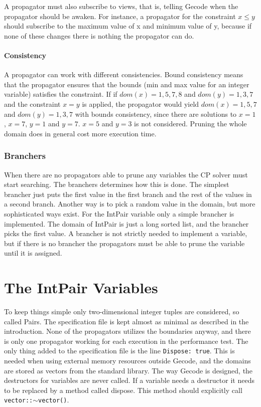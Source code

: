 \documentclass[a4paper,11pt]{article}
\begin{document}
A propagator must also subscribe to views, that is, telling Gecode when the propagator should be awaken. For instance, a propagator for the constraint $x\le y$ should subscribe to the maximum value of x and minimum value of y, because if none of these changes there is nothing the propagator can do.

\paragraph{Consistency}
A propagator can work with different consistencies. Bound consistency means that the propagator ensures that the bounds (min and max value for an integer variable) satisfies the constraint. If if $dom(x)={1,5,7,8}$ and $dom(y)={1,3,7}$ and the constraint $x=y$ is applied, the propagator would yield $dom(x)={1,5,7}$ and $dom(y)={1,3,7}$ with bounds consistency, since there are solutions to $x=1$, $x=7$, $y=1$ and $y=7$. $x=5$ and $y=3$ is not considered. Pruning the whole domain does in general cost more execution time.

\subsubsection{Branchers}
When there are no propagators able to prune any variables the CP solver must start searching. The branchers determines how this is done. The simplest brancher just puts the first value in the first branch and the rest of the values in a second branch. Another way is to pick a random value in the domain, but more sophisticated ways exist. For the IntPair variable only a simple brancher is implemented. The domain of IntPair is just a long sorted list, and the brancher picks the first value. A brancher is not strictly needed to implement a variable, but if there is no brancher the propagators must be able to prune the variable until it is assigned. 

\section{The IntPair Variables}
To keep things simple only two-dimensional integer tuples are considered, so called Pairs. The specification file is kept almost as minimal as described in the introduction. None of the propagators utilizes the boundaries anyway, and there is only one propagator working for each execution in the performance test. The only thing added to the specification file is the line \texttt{Dispose: true}. This is needed when using external memory resources outside Gecode, and the domains are stored as vectors from the standard library. The way Gecode is designed, the destructors for variables are never called. If a variable needs a destructor it needs to be replaced by a method called dispose. This method should explicitly call \texttt{vector::$\sim$vector()}.
\end{document}
